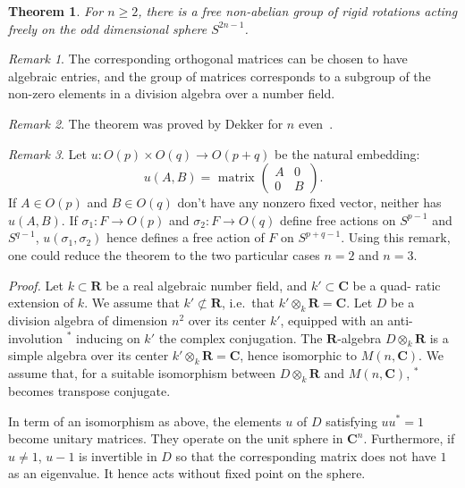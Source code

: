 \documentclass[12pt,a4paper]{article}
\theoremstyle{plain}
\newtheorem{theorem}{Theorem}
\theoremstyle{remark}
\newtheorem*{remark}{Remark}
\begin{document}
\begin{theorem}
For $n \geq 2$, there is a free non-abelian group of rigid rotations
acting freely on the odd dimensional sphere $S^{2n-1}$.
\end{theorem}

\begin{remark}
The corresponding orthogonal matrices can be chosen to have
algebraic entries, and the group of matrices corresponds to a subgroup of the
non-zero elements in a division algebra over a number field.
\end{remark}

\begin{remark}
The theorem was proved by Dekker for $n$ even~{\upshape [D]}.
\end{remark}

\begin{remark}
Let $u : O(p) \times O(q) \to O(p+q)$ be the natural embedding:
\[
u(A, B) = \text{ matrix } \begin{pmatrix} A & 0 \\ 0 & B \end{pmatrix}.
\]
If $A \in O(p)$ and $B \in O(q)$ don't have any nonzero fixed vector, neither has
$u(A, B)$. If $\sigma_1 : F \to O(p)$ and $\sigma_2 : F \to O(q)$ define free actions on $S^{p-1}$ and
$S^{q-1}$, $u(\sigma_1, \sigma_2)$ hence defines a free action of $F$ on $S^{p+q-1}$. Using this remark,
one could reduce the theorem to the two particular cases $n=2$ and $n=3$.
\end{remark}

\textit{Proof.} Let $k \subset \mathbf{R}$ be a real algebraic number field, and $k' \subset \mathbf{C}$ be a quad-
ratic extension of $k$. We assume that $k' \not\subset \mathbf{R}$, i.e.\ that $k' \otimes_k \mathbf{R} = \mathbf{C}$. Let $D$ be a
division algebra of dimension $n^2$ over its center $k'$, equipped with an anti-
involution ${}^*$ inducing on $k'$ the complex conjugation. The $\mathbf{R}$-algebra $D \otimes_k \mathbf{R}$ is
a simple algebra over its center $k' \otimes_k \mathbf{R} = \mathbf{C}$, hence isomorphic to $M(n, \mathbf{C})$.
We assume that, for a suitable isomorphism between $D \otimes_k \mathbf{R}$ and $M(n, \mathbf{C})$, ${}^*$
becomes transpose conjugate.

In term of an isomorphism as above, the elements $u$ of $D$ satisfying $uu^* = 1$
become unitary matrices. They operate on the unit sphere in $\mathbf{C}^n$. Furthermore,
if $u \neq 1$, $u - 1$ is invertible in $D$ so that the corresponding matrix does not
have $1$ as an eigenvalue. It hence acts without fixed point on the sphere.
\end{document}
